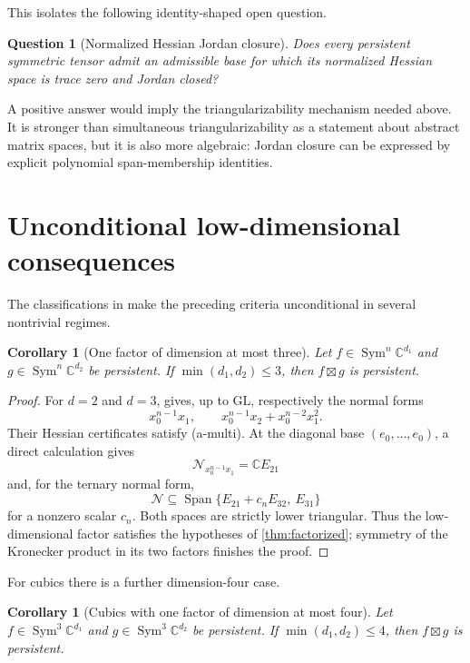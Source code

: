 \documentclass[11pt]{amsart}
\newtheorem{corollary}[theorem]{Corollary}
\newtheorem{question}[theorem]{Question}
\newcommand{\C}{\mathbb C}
\newcommand{\Sym}{\operatorname{Sym}}
\newcommand{\Span}{\operatorname{Span}}
\newcommand{\boxt}{\mathbin{\boxtimes}}
\newcommand{\Nsp}{\mathcal N}
\begin{document}
This isolates the following identity-shaped open question.

\begin{question}[Normalized Hessian Jordan closure]\label{q:JC}
Does every persistent symmetric tensor admit an admissible base for which its
normalized Hessian space is trace zero and Jordan closed?
\end{question}

A positive answer would imply the triangularizability mechanism needed above.
It is stronger than simultaneous triangularizability as a statement about
abstract matrix spaces, but it is also more algebraic: Jordan closure can be
expressed by explicit polynomial span-membership identities.

\section{Unconditional low-dimensional consequences}

The classifications in \cite[Theorem~5]{GO25} make the preceding criteria
unconditional in several nontrivial regimes.

\begin{corollary}[One factor of dimension at most three]\label{cor:small-d}
Let $f\in\Sym^n\C^{d_1}$ and $g\in\Sym^n\C^{d_2}$ be persistent.  If
$\min(d_1,d_2)\le3$, then $f\boxt g$ is persistent.
\end{corollary}

\begin{proof}
For $d=2$ and $d=3$, \cite[Theorem~5]{GO25} gives, up to $\mathrm{GL}$,
respectively the normal forms
\[
 x_0^{n-1}x_1,
 \qquad
 x_0^{n-1}x_2+x_0^{n-2}x_1^2.
\]
Their Hessian certificates satisfy (a-multi).  At the diagonal base
$(e_0,\ldots,e_0)$, a direct calculation gives
\[
 \Nsp_{x_0^{n-1}x_1}=\C E_{21}
\]
and, for the ternary normal form,
\[
 \Nsp\subseteq
 \Span\{E_{21}+c_nE_{32},\ E_{31}\}
\]
for a nonzero scalar $c_n$.  Both spaces are strictly lower triangular.
Thus the low-dimensional factor satisfies the hypotheses of
\cref{thm:factorized}; symmetry of the Kronecker product in its two factors
finishes the proof.
\end{proof}

For cubics there is a further dimension-four case.

\begin{corollary}[Cubics with one factor of dimension at most four]
\label{cor:cubic-d4}
Let $f\in\Sym^3\C^{d_1}$ and $g\in\Sym^3\C^{d_2}$ be persistent.  If
$\min(d_1,d_2)\le4$, then $f\boxt g$ is persistent.
\end{corollary}
\end{document}
